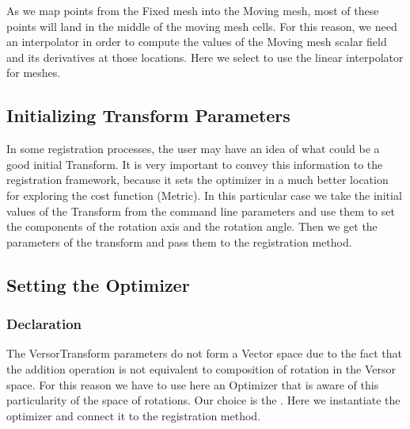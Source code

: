 \documentclass{InsightArticle}
\begin{document}
As we map points from the Fixed mesh into the Moving mesh, most of these points
will land in the middle of the moving mesh cells. For this reason, we need an
interpolator in order to compute the values of the Moving mesh scalar field and
its derivatives at those locations. Here we select to use the linear
interpolator for meshes.

\begin{center}

\end{center}


\subsection{Initializing Transform Parameters}

In some registration processes, the user may have an idea of what could be a
good initial Transform. It is very important to convey this information to the
registration framework, because it sets the optimizer in a much better location
for exploring the cost function (Metric).  In this particular case we take the
initial values of the Transform from the command line parameters and use them
to set the components of the rotation axis and the rotation angle. Then we get
the parameters of the transform and pass them to the registration method.

\begin{center}

\end{center}


\subsection{Setting the Optimizer}


\subsubsection{Declaration}

The VersorTransform parameters do not form a Vector space due to the fact that
the addition operation is not equivalent to composition of rotation in the
Versor space. For this reason we have to use here an Optimizer that is aware of
this particularity of the space of rotations. Our choice is the
. Here we instantiate the optimizer and
connect it to the registration method.
\end{document}

